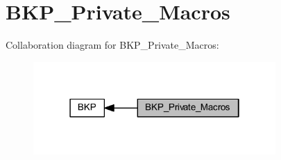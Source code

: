 \hypertarget{group___b_k_p___private___macros}{}\section{B\+K\+P\+\_\+\+Private\+\_\+\+Macros}
\label{group___b_k_p___private___macros}
Collaboration diagram for B\+K\+P\+\_\+\+Private\+\_\+\+Macros\+:
\nopagebreak
\begin{figure}[H]
\begin{center}
\leavevmode
\includegraphics[width=262pt]{group___b_k_p___private___macros}
\end{center}
\end{figure}
